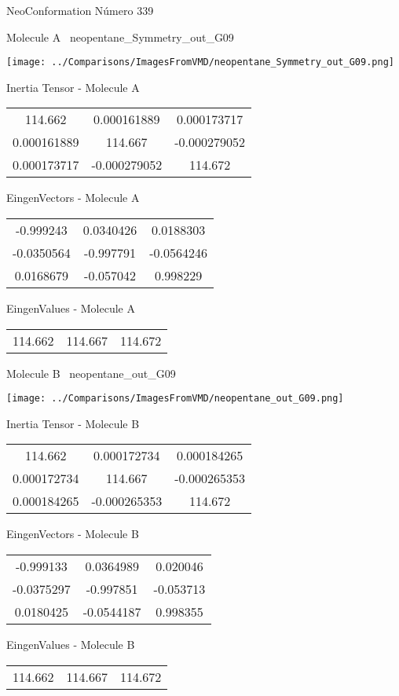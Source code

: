 \vtab[-3cm]
\begin{center}
{\large NeoConformation \tab Número 339}
\end{center}
\begin{multicols}{2}
\begin{center}

Molecule A \
neopentane\_Symmetry\_out\_G09

\texttt{[image: ../Comparisons/ImagesFromVMD/neopentane\_Symmetry\_out\_G09.png]}

Inertia Tensor - Molecule A \\
\begin{tabular}{|c c c|}
114.662	 & 	0.000161889	 & 	0.000173717	 \\
0.000161889	 & 	114.667	 & 	-0.000279052	 \\
0.000173717	 & 	-0.000279052	 & 	114.672
\end{tabular}

\vtab
 EingenVectors - Molecule A     \\
\begin{tabular}{|c c c|}
-0.999243	 & 	0.0340426	 & 	0.0188303	 \\
-0.0350564	 & 	-0.997791	 & 	-0.0564246	 \\
0.0168679	 & 	-0.057042	 & 	0.998229
\end{tabular}

\vtab
 EingenValues - Molecule A     \\
\begin{tabular}{|c c c|}
114.662	 & 	114.667	 & 	114.672	 \\
\end{tabular}
\columnbreak

Molecule B \
neopentane\_out\_G09

\texttt{[image: ../Comparisons/ImagesFromVMD/neopentane\_out\_G09.png]}

Inertia Tensor - Molecule B \\
\begin{tabular}{|c c c|}
114.662	 & 	0.000172734	 & 	0.000184265	 \\
0.000172734	 & 	114.667	 & 	-0.000265353	 \\
0.000184265	 & 	-0.000265353	 & 	114.672
\end{tabular}

\vtab
 EingenVectors - Molecule B     \\
\begin{tabular}{|c c c|}
-0.999133	 & 	0.0364989	 & 	0.020046	 \\
-0.0375297	 & 	-0.997851	 & 	-0.053713	 \\
0.0180425	 & 	-0.0544187	 & 	0.998355
\end{tabular}

\vtab
 EingenValues - Molecule B     \\
\begin{tabular}{|c c c|}
114.662	 & 	114.667	 & 	114.672	 \\
\end{tabular}

\end{center}
\end{multicols}

